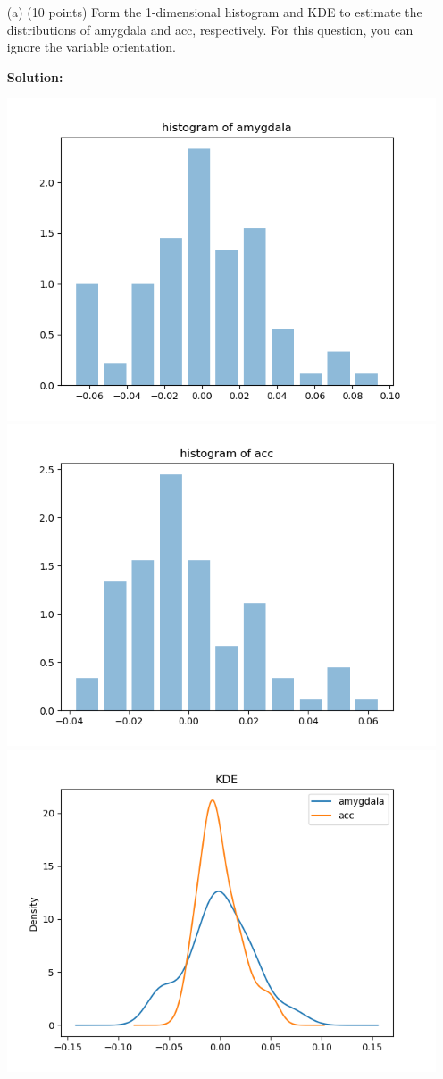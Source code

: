 \documentclass[twoside,12pt]{article}
\begin{document}
 \begin{enumerate}
 
 
 \item[(a)] (10 points) Form the 1-dimensional histogram and KDE to estimate the distributions of \textsf{amygdala} and \textsf{acc}, respectively. For this question, you can ignore the variable \textsf{orientation}.
 \begin{tcolorbox}
 \textbf{Solution:} \\
 \begin{center}
  \includegraphics[width=.48\textwidth]{hist_amy.png}
  \includegraphics[width=.48\textwidth]{hist_acc.png}
  \includegraphics[width=.8\textwidth]{kde.png}
  \end{center}
 \end{tcolorbox}
 

\end{enumerate}
\end{document}
